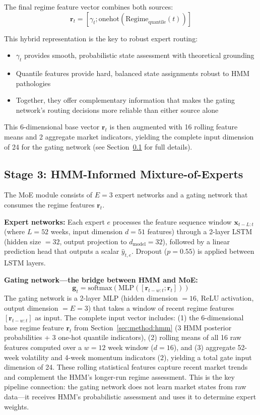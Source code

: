 \documentclass[3p,times]{elsarticle}
\begin{document}
The final regime feature vector combines both sources:
\begin{equation}
\mathbf{r}_t = [\gamma_t; \text{onehot}(\text{Regime}_{\text{quantile}}(t))]
\end{equation}

This hybrid representation is the key to robust expert routing:
\begin{itemize}
\item $\gamma_t$ provides smooth, probabilistic state assessment with theoretical grounding
\item Quantile features provide hard, balanced state assignments robust to HMM pathologies
\item Together, they offer complementary information that makes the gating network's routing decisions more reliable than either source alone
\end{itemize}

This 6-dimensional base vector $\mathbf{r}_t$ is then augmented with 16 rolling feature means and 2 aggregate market indicators, yielding the complete input dimension of 24 for the gating network (see Section~\ref{sec:method:moe} for full details).

\subsection{Stage 3: HMM-Informed Mixture-of-Experts}
\label{sec:method:moe}

The MoE module consists of $E=3$ expert networks and a gating network that consumes the regime features $\mathbf{r}_t$.

\textbf{Expert networks:} Each expert $e$ processes the feature sequence window $\mathbf{x}_{t-L:t}$ (where $L=52$ weeks, input dimension $d=51$ features) through a 2-layer LSTM (hidden size $= 32$, output projection to $d_{\text{model}}=32$), followed by a linear prediction head that outputs a scalar $\hat{y}_{t,e}$. Dropout ($p=0.55$) is applied between LSTM layers.

\textbf{Gating network---the bridge between HMM and MoE:}
\begin{equation}
\mathbf{g}_t = \text{softmax}(\text{MLP}([\mathbf{r}_{t-w:t}; \mathbf{r}_t]))
\end{equation}
The gating network is a 2-layer MLP (hidden dimension $= 16$, ReLU activation, output dimension $= E=3$) that takes a window of recent regime features $[\mathbf{r}_{t-w:t}]$ as input. The complete input vector includes: (1) the 6-dimensional base regime feature $\mathbf{r}_t$ from Section~\ref{sec:method:hmm} (3 HMM posterior probabilities + 3 one-hot quantile indicators), (2) rolling means of all 16 raw features computed over a $w=12$ week window ($d=16$), and (3) aggregate 52-week volatility and 4-week momentum indicators ($2$), yielding a total gate input dimension of 24. These rolling statistical features capture recent market trends and complement the HMM's longer-run regime assessment. This is the key pipeline connection: the gating network does not learn market states from raw data---it receives HMM's probabilistic assessment and uses it to determine expert weights.
\end{document}
